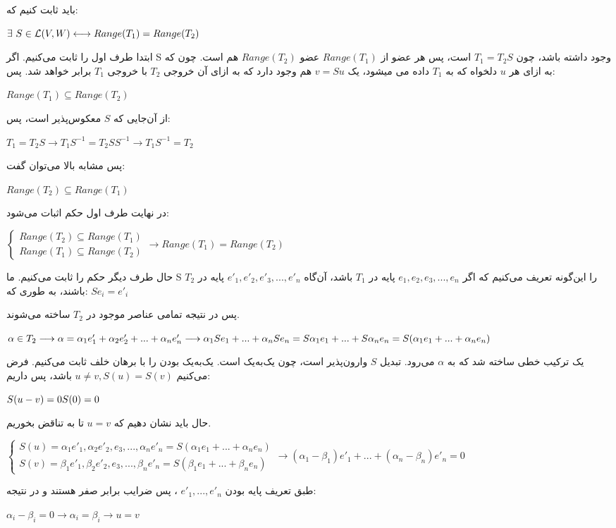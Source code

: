 باید ثابت کنیم که:

\setLTR
$
\exists \ S \in \mathcal{L}(V,W) \longleftrightarrow Range(T_1) = Range(T_2) \\ 
$
\setRTL

ابتدا طرف اول را ثابت می‌کنیم. اگر S وجود داشته باشد، چون 
$T_1 = T_2 S$
است، پس هر عضو از 
$Range(T_1)$
عضو 
$Range(T_2)$
هم است. چون که به ازای هر 
$u$
دلخواه که به 
$T_1$
داده می	‌میشود، یک
$v=Su$
هم وجود دارد که به ازای آن خروجی 
$T_2$
با خروجی 
$T_1$
برابر خواهد شد. پس:

\setLTR
$
Range(T_1) \subseteq Range(T_2)
$
\setRTL

از آن‌جایی که 
$S$
معکوس‌پذیر است، پس:

\setLTR
$
T_1 = T_2 S \longrightarrow T_1S^{-1} = T_2SS^{-1} \longrightarrow T_1S^{-1}=T_2
$
\setRTL

پس مشابه بالا می‌توان گفت:

\setLTR
$
Range(T_2) \subseteq Range(T_1)
$
\setRTL

در نهایت طرف اول حکم اثبات می‌شود:

\setLTR
$
\begin{cases}
	Range(T_2) \subseteq Range(T_1) \\
	Range(T_1) \subseteq Range(T_2)
	
\end{cases} \longrightarrow Range(T_1) = Range(T_2)
$
\setRTL

حال طرف دیگر حکم را ثابت می‌کنیم. ما S را این‌گونه تعریف می‌کنیم که اگر 
$e_1 , e_2 , e_3 ,...,e_n$
پایه در 
$T_1$
باشد، آن‌گاه 
$e'_1 , e'_2 , e'_3 ,...,e'_n$
پایه در 
$T_2$
باشند، به طوری که:
$Se_i=e'_i$

پس در نتیجه تمامی عناصر موجود در
$T_2$
ساخته می‌شوند.

\setLTR
$
\alpha \in T_2 \longrightarrow \alpha = \alpha_1e'_1 + \alpha_2e'_2 +...+\alpha_ne'_n \longrightarrow \\ \alpha_1Se_1 + ... + \alpha_nSe_n = S\alpha_1e_1 + ... + S\alpha_ne_n = S(\alpha_1e_1 + ... + \alpha_ne_n)
$
\setRTL

یک ترکیب خطی ساخته شد که به 
$\alpha$
می‌رود. تبدیل 
$S$
وارون‌پذیر است، چون یک‌به‌یک است. یک‌به‌یک بودن را با برهان خلف ثابت می‌کنیم. فرض می‌کنیم 
$u \neq v , S(u) = S(v)$
باشد، پس داریم:

\setLTR
$
S(u-v) = 0  \\ S(0) = 0
$
\setRTL

حال باید نشان دهیم که 
$u = v$
تا به تناقض بخوریم.

\setLTR
$
\begin{cases}
S(u) = \alpha_1e'_1 , \alpha_2e'_2 , e_3 ,...,\alpha_ne'_n = S(\alpha_1e_1 + ... + \alpha_ne_n) \\
S(v) = \beta_1e'_1 , \beta_2e'_2 , e_3 ,...,\beta_ne'_n = S(\beta_1e_1 + ... + \beta_ne_n)
\end{cases} \rightarrow (\alpha_1-\beta_1)e'_1 + ... + (\alpha_n-\beta_n)e'_n =0
$
\setRTL

طبق تعریف پایه بودن 
$e'_1 , ... , e'_n$
، پس ضرایب برابر صفر هستند و در نتیجه:

\setLTR
$
\alpha_i - \beta_i =0 \longrightarrow \alpha_i = \beta_i \longrightarrow u = v
$
\setRTL











